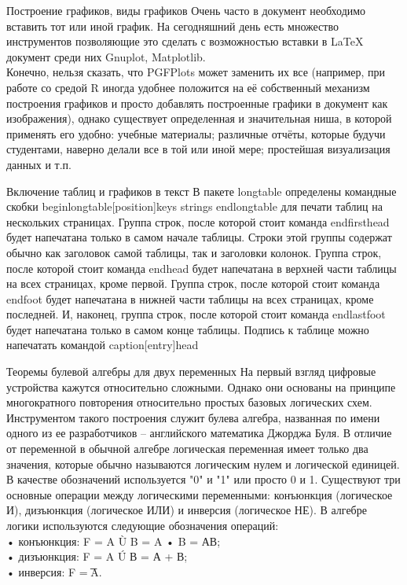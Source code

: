 \documentclass{beamer}
\begin{document}
\begin{frame}{Построение графиков, виды графиков}
Очень часто в документ необходимо вставить тот или иной график. На сегодняшний день есть множество инструментов позволяющие это сделать с возможностью вставки в LaTeX документ среди них Gnuplot, Matplotlib.\\
Конечно, нельзя сказать, что PGFPlots может заменить их все (например, при работе со средой R иногда удобнее положится на её собственный механизм построения графиков и просто добавлять построенные графики в документ как изображения), однако существует определенная и значительная ниша, в которой применять его удобно: учебные материалы; различные отчёты, которые будучи студентами, наверно делали все в той или иной мере; простейшая визуализация данных и т.п.

\end{frame}

\begin{frame}{Включение таблиц и графиков в текст}
В пакете longtable определены командные скобки
begin{longtable}[position]{keys}
strings
end{longtable}
для печати таблиц на нескольких страницах. Группа строк, после которой стоит
команда
endfirsthead
будет напечатана только в самом начале таблицы. Строки этой группы содержат обычно как заголовок
самой таблицы, так и заголовки колонок. Группа строк, после которой стоит команда
endhead
будет напечатана в верхней части таблицы на всех страницах, кроме первой. Группа строк, после
которой стоит команда
endfoot
будет напечатана в нижней части таблицы на всех страницах, кроме последней. И, наконец, группа
строк, после которой стоит команда
endlastfoot
будет напечатана только в самом конце таблицы.
Подпись к таблице можно напечатать командой
caption[entry]{head}

\end{frame}

\begin{frame}{Теоремы булевой алгебры для двух переменных}
На первый взгляд цифровые устройства кажутся относительно сложными. Однако они основаны на принципе многократного повторения относительно простых базовых логических схем. Инструментом такого построения служит булева алгебра, названная по имени одного из ее разработчиков – английского математика Джорджа Буля. В отличие от переменной в обычной алгебре логическая переменная имеет только два значения, которые обычно называются логическим нулем и логической единицей. В качестве обозначений используется "0" и "1" или просто 0 и 1.
Существуют три основные операции между логическими переменными: конъюнкция (логическое И), дизъюнкция (логическое ИЛИ) и инверсия (логическое НЕ). В алгебре логики используются следующие обозначения операций:\\
• конъюнкция: F = A Ù B = A • B = АВ;\\
• дизъюнкция: F = A Ú В = А + В;\\
• инверсия: F = ͞A.
\end{frame}
\end{document}
